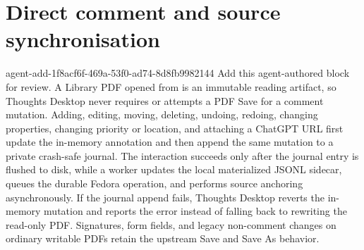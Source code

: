 \section*{Direct comment and source synchronisation}
\agentProposedEdit
  {agent-add-1f8acf6f-469a-53f0-ad74-8d8fb9982144}
  {Add this agent-authored block for review.}
  {}
  {A Library PDF opened from  is an immutable reading artifact, so Thoughts Desktop never requires or attempts a PDF Save for a comment mutation.
Adding, editing, moving, deleting, undoing, redoing, changing properties, changing priority or location, and attaching a ChatGPT URL first update the in-memory annotation and then append the same mutation to a private crash-safe journal.
The interaction succeeds only after the journal entry is flushed to disk, while a worker updates the local materialized JSONL sidecar, queues the durable Fedora operation, and performs source anchoring asynchronously.
If the journal append fails, Thoughts Desktop reverts the in-memory mutation and reports the error instead of falling back to rewriting the read-only PDF.
Signatures, form fields, and legacy non-comment changes on ordinary writable PDFs retain the upstream Save and Save As behavior.}

